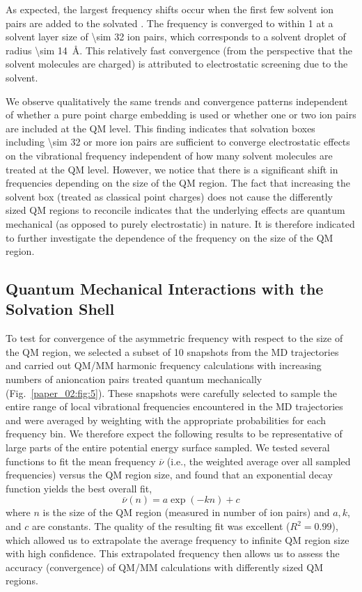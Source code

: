 \documentclass[%
  class = book,%
  crop = false,%
  float = true,%
  multi = true,%
  preview = false,%
]{standalone}
\begin{document}
As expected, the largest frequency shifts occur when the first few solvent ion pairs are added to the solvated . The frequency is converged to within \SI{1}{\wavenumber} at a solvent layer size of \num{\sim 32} ion pairs, which corresponds to a solvent droplet of radius \SI{\sim 14}{\angstrom}. This relatively fast convergence (from the perspective that the solvent molecules are charged) is attributed to electrostatic screening due to the solvent.

We observe qualitatively the same trends and convergence patterns independent of whether a pure point charge embedding is used or whether one or two ion pairs are included at the QM level. This finding indicates that solvation boxes including \num{\sim 32} or more ion pairs are sufficient to converge electrostatic effects on the vibrational frequency independent of how many solvent molecules are treated at the QM level. However, we notice that there is a significant shift in frequencies depending on the size of the QM region. The fact that increasing the solvent box (treated as classical point charges) does not cause the differently sized QM regions to reconcile indicates that the underlying effects are quantum mechanical (as opposed to purely electrostatic) in nature. It is therefore indicated to further investigate the dependence of the frequency on the size of the QM region.

\subsection{Quantum Mechanical Interactions with the Solvation Shell}
\label{paper_02:ssec:IIIE}

To test for convergence of the asymmetric frequency with respect to the size of the QM region, we selected a subset of \num{10} snapshots from the MD trajectories and carried out QM/MM harmonic frequency calculations with increasing numbers of anion\textendash{}cation pairs treated quantum mechanically (Fig.~\ref{paper_02:fig:5}). These snapshots were carefully selected to sample the entire range of local vibrational frequencies encountered in the MD trajectories and were averaged by weighting with the appropriate probabilities for each frequency bin. We therefore expect the following results to be representative of large parts of the entire potential energy surface sampled. We tested several functions to fit the mean frequency \(\overline{\nu}\) (i.e., the weighted average over all sampled frequencies) versus the QM region size, and found that an exponential decay function yields the best overall fit,
\begin{equation*}
  \overline{\nu}\left( n \right) = a\exp{\left( -kn \right)} + c
\end{equation*}
where \(n\) is the size of the QM region (measured in number of ion pairs) and \(a, k\), and \(c\) are constants. The quality of the resulting fit was excellent (\(R^2 = 0.99\)), which allowed us to extrapolate the average frequency to infinite QM region size with high confidence. This extrapolated frequency then allows us to assess the accuracy (convergence) of QM/MM calculations with differently sized QM regions.
\end{document}
